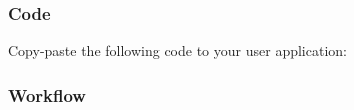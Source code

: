 \hypertarget{asfdoc_sam0_sercom_usart_basic_use_case_asfdoc_sam0_usart_basic_use_case_main_code}{}\subsubsection{Code}\label{asfdoc_sam0_sercom_usart_basic_use_case_asfdoc_sam0_usart_basic_use_case_main_code}
Copy-\/paste the following code to your user application\+: 
\begin{DoxyCodeInclude}{0}
\end{DoxyCodeInclude}
 \hypertarget{asfdoc_sam0_sercom_usart_basic_use_case_asfdoc_sam0_usart_basic_use_case_main_flow}{}\subsubsection{Workflow}\label{asfdoc_sam0_sercom_usart_basic_use_case_asfdoc_sam0_usart_basic_use_case_main_flow}

